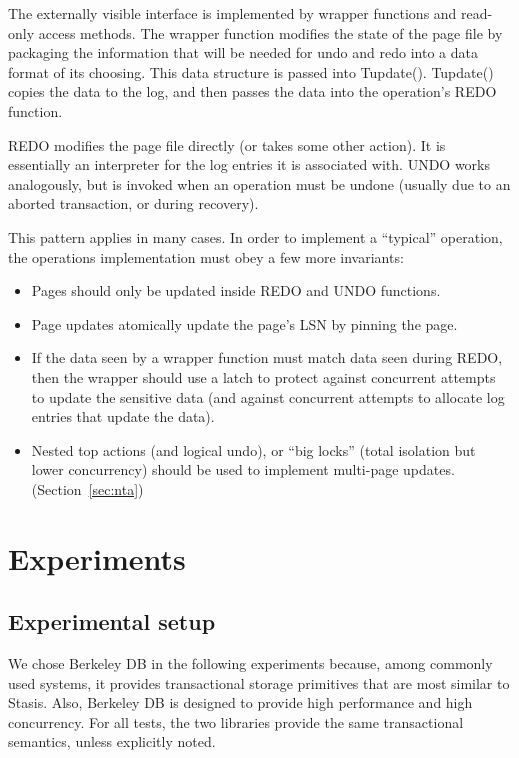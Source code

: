\documentclass[letterpaper,twocolumn,10pt]{article}
\newcommand{\yad}{Stasis\xspace}
\begin{document}
The externally visible interface is implemented by wrapper functions
and read-only access methods.  The wrapper function modifies the state
of the page file by packaging the information that will be needed for
undo and redo into a data format of its choosing.  This data structure
is passed into Tupdate().  Tupdate() copies the data to the log, and
then passes the data into the operation's REDO function.
 
REDO modifies the page file directly (or takes some other action).  It
is essentially an interpreter for the log entries it is associated
with.  UNDO works analogously, but is invoked when an operation must
be undone (usually due to an aborted transaction, or during recovery).

This pattern applies in many cases.  In
order to implement a ``typical'' operation, the operations
implementation must obey a few more invariants:

\begin{itemize}
\item Pages should only be updated inside REDO and UNDO functions.
\item Page updates atomically update the page's LSN by pinning the page.
\item If the data seen by a wrapper function must match data seen
  during REDO, then the wrapper should use a latch to protect against
  concurrent attempts to update the sensitive data (and against
  concurrent attempts to allocate log entries that update the data).
\item Nested top actions (and logical undo), or ``big locks'' (total isolation but lower concurrency) should be used to implement multi-page updates. (Section~\ref{sec:nta})
\end{itemize}

\section{Experiments}
\subsection{Experimental setup}



\label{sec:experimental_setup}

We chose Berkeley DB in the following experiments because, among
commonly used systems, it provides transactional storage primitives
that are most similar to \yad.  Also, Berkeley DB is designed to provide high
performance and high concurrency.  For all tests, the two libraries
provide the same transactional semantics, unless explicitly noted.
\end{document}
